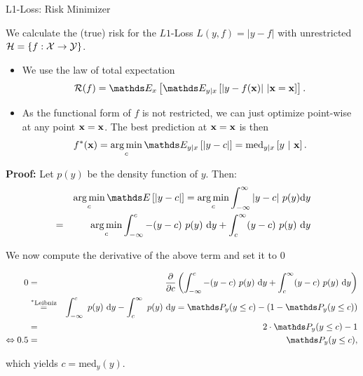 \documentclass[11pt,compress,t,notes=noshow, xcolor=table]{beamer}
\begin{document}
\begin{vbframe}{L1-Loss: Risk Minimizer}

We calculate the (true) risk for the $L1$-Loss $L(y,f) = \left|y-f\right|$ with unrestricted $\mathcal{H} = \{f: \mathcal{X} \to \mathcal{Y}\}$. 

\vspace{0.5cm}

\begin{itemize}
  \setlength{\itemsep}{1.4em}  
  \item We use the law of total expectation
  \vspace{0.3cm}
  $$
    \riskf = \E_x \left[\E_{y|x}\left[|y-\fx|~|\xv = \xv\right]\right]. 
  $$
  \item As the functional form of $f$ is not restricted, we can just optimize point-wise at any point $\mathbf{x} = \mathbf{x}$. The best prediction at $\mathbf{x} = \mathbf{x}$ is then 
  \vspace{0.3cm}  
  $$
    f^{\ast}(\xv) = \argmin_c \E_{y|x}\left[|y - c|\right]= \text{med}_{y|x} \left[y ~|~ \xv \right]. 
  $$

\end{itemize}

  \framebreak 

\begin{footnotesize}
\textbf{Proof:} Let $p(y)$ be the density function of $y$. Then: 
  \begin{eqnarray*}
  && \argmin_c \E\left[|y - c|\right] = \argmin_c \int_{-\infty}^\infty |y - c| ~ p(y) \text{d}y \\
  &=& \argmin_c \int_{-\infty}^c -(y - c)~p(y)~\text{d}y + \int_c^\infty (y - c)~p(y)~\text{d}y 
  \end{eqnarray*}

We now compute the derivative of the above term and set it to $0$

\begin{eqnarray*}
0 &=& \frac{\partial}{\partial c} \left(\int_{-\infty}^c -(y - c)~p(y)~\text{d}y + \int_c^\infty (y - c)~p(y)~\text{d}y\right) \\ &\overset{^\ast\text{Leibniz}}{=}& \int_{-\infty}^c  ~p(y)~\text{d}y - \int_c^\infty ~p(y)~\text{d}y =   \P_y (y \le c) - \left(1 - \P_y (y \le c)\right) \\
&=& 2 \cdot \P_y (y \le c) - 1 \\
\Leftrightarrow 0.5 &=& \P_y (y \le c),
\end{eqnarray*}

which yields $c = \text{med}_y(y)$. 


\end{footnotesize}
\end{vbframe}
\end{document}
